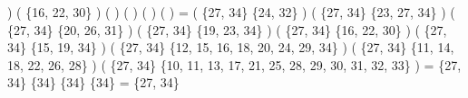 \documentclass[a4paper,11pt]{article}
\begin{document}
\Big) \cup \Big(  \cap \{16, 22, 30\} \Big) \cup \Big(  \cap {} \Big) \cup \Big(  \cap {} \Big) \cup \Big(  \cap {} \Big) \cup \Big(  \cap {} \Big) = \Big( \{27, 34\} \cap \{24, 32\} \Big) \cup \Big( \{27, 34\} \cap \{23, 27, 34\} \Big) \cup \Big( \{27, 34\} \cap \{20, 26, 31\} \Big) \cup \Big( \{27, 34\} \cap \{19, 23, 34\} \Big) \cup \Big( \{27, 34\} \cap \{16, 22, 30\} \Big) \cup \Big( \{27, 34\} \cap \{15, 19, 34\} \Big) \cup \Big( \{27, 34\} \cap \{12, 15, 16, 18, 20, 24, 29, 34\} \Big) \cup \Big( \{27, 34\} \cap \{11, 14, 18, 22, 26, 28\} \Big) \cup \Big( \{27, 34\} \cap \{10, 11, 13, 17, 21, 25, 28, 29, 30, 31, 32, 33\} \Big) = \varnothing \cup \{27, 34\} \cup \varnothing \cup \{34\} \cup \varnothing \cup \{34\} \cup \{34\} \cup \varnothing \cup \varnothing = \{27, 34\}\\
\end{document}
